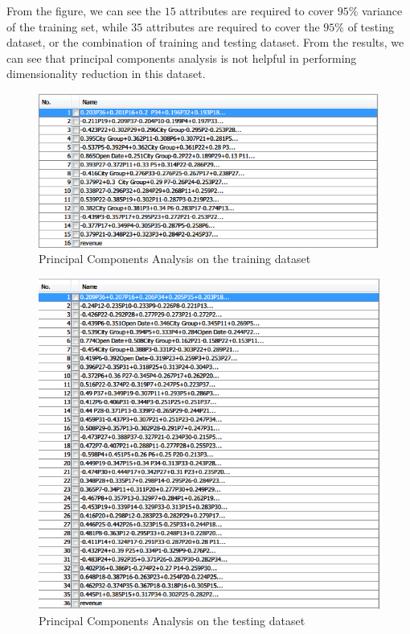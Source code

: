 \documentclass[10pt, oneside]{article}   	%
\begin{document}
From the figure, we can see the $15$ attributes are required to cover $95\%$ variance of the training set, while $35$ attributes are required to cover the $95\%$ of testing dataset, or the combination of training and testing dataset. From the results, we can see that principal components analysis is not helpful in performing dimensionality reduction in this dataset.

\begin{figure}[!ht] %
   \centering
   \includegraphics[width=5in]{figs/pca_seperate.PNG} 
   \caption{Principal Components Analysis on the training dataset}
   \label{fig:pca_train}
\end{figure}

\begin{figure}[!ht] %
   \centering
   \includegraphics[width=5in]{figs/pca_test.PNG} 
   \caption{Principal Components Analysis on the testing dataset}
   \label{fig:pca_test}
\end{figure}
\end{document}
